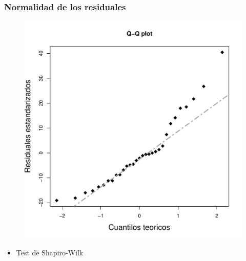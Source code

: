 \documentclass[mathserif]{beamer}
\begin{document}
\begin{frame}[label=assumcheck2]
   \frametitle{Normalidad de los residuales}
   \vspace{-0.5cm}
   \begin{figure}
      \includegraphics[scale=0.4]{figs/nonorm1.pdf}
   \end{figure}
   \vspace{-0.7cm}
   \begin{itemize}
      \item<2-| visible@2-| handout:1> Test de Shapiro-Wilk
   \end{itemize}
\end{frame}%
\end{document}
